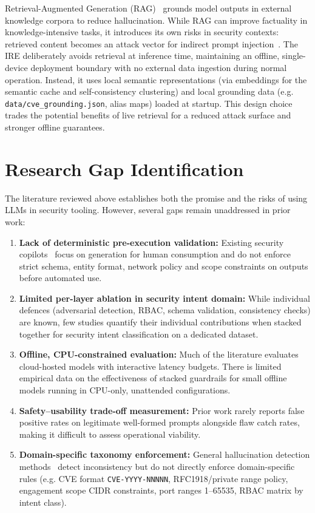 Retrieval-Augmented Generation (RAG)~\cite{lewis2020rag} grounds model outputs in external knowledge corpora to reduce hallucination. While RAG can improve factuality in knowledge-intensive tasks, it introduces its own risks in security contexts: retrieved content becomes an attack vector for indirect prompt injection~\cite{greshake2023indirect}. The IRE deliberately avoids retrieval at inference time, maintaining an offline, single-device deployment boundary with no external data ingestion during normal operation. Instead, it uses local semantic representations (via embeddings for the semantic cache and self-consistency clustering) and local grounding data (e.g. \texttt{data/cve\_grounding.json}, alias maps) loaded at startup. This design choice trades the potential benefits of live retrieval for a reduced attack surface and stronger offline guarantees.

\section{Research Gap Identification}\label{sec:lit-gap}

The literature reviewed above establishes both the promise and the risks of using LLMs in security tooling. However, several gaps remain unaddressed in prior work:

\begin{enumerate}
  \item \textbf{Lack of deterministic pre-execution validation:} Existing security copilots~\cite{deng2024pentestgpt,happe2023pwned} focus on generation for human consumption and do not enforce strict schema, entity format, network policy and scope constraints on outputs before automated use.
  \item \textbf{Limited per-layer ablation in security intent domain:} While individual defences (adversarial detection, RBAC, schema validation, consistency checks) are known, few studies quantify their individual contributions when stacked together for security intent classification on a dedicated dataset.
  \item \textbf{Offline, CPU-constrained evaluation:} Much of the literature evaluates cloud-hosted models with interactive latency budgets. There is limited empirical data on the effectiveness of stacked guardrails for small offline models running in CPU-only, unattended configurations.
  \item \textbf{Safety–usability trade-off measurement:} Prior work rarely reports false positive rates on legitimate well-formed prompts alongside flaw catch rates, making it difficult to assess operational viability.
  \item \textbf{Domain-specific taxonomy enforcement:} General hallucination detection methods~\cite{manakul2023selfcheckgpt,farquhar2024semantic} detect inconsistency but do not directly enforce domain-specific rules (e.g. CVE format \texttt{CVE-YYYY-NNNNN}, RFC1918/private range policy, engagement scope CIDR constraints, port ranges 1–65535, RBAC matrix by intent class).
\end{enumerate}

